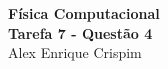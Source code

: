 


  \begin{center}
    \LARGE \textbf{Física Computacional} \\
    \Large \textbf{Tarefa 7 - Questão 4} \\
    \large Alex Enrique Crispim
  \end{center}

  


